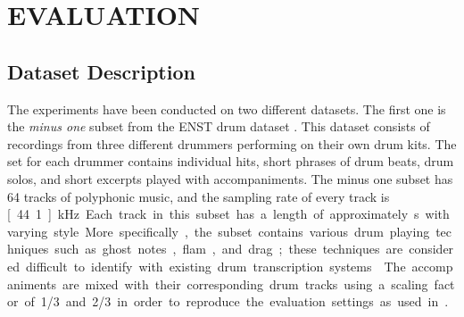 \documentclass{article}
\begin{document}
\section{EVALUATION}\label{sec:Evaluation}
\subsection{Dataset Description}\label{subsec:dataset description}
The experiments have been conducted on two different datasets. The first one is the \textit{minus one} subset from the ENST drum dataset \cite{gillet_enst-drums:_2006}. This dataset consists of recordings from three different drummers performing on their own drum kits. The set for each drummer contains individual hits, short phrases of drum beats, drum solos, and short excerpts played with accompaniments. The minus one subset has 64 tracks of polyphonic music, and the sampling rate of every track is \unit[44.1]{kHz}. Each track in this subset has a length of approximately \unit[70]{s} with varying style. More specifically, the subset contains various drum playing techniques such as ghost notes, flam, and drag; these techniques are considered difficult to identify with existing drum transcription systems\cite{gillet_transcription_2008}. The accompaniments are mixed with their corresponding drum tracks using a scaling factor of 1/3 and 2/3 in order to reproduce the evaluation settings as used in \cite{Paulus2009a}. %
 
\end{document}
